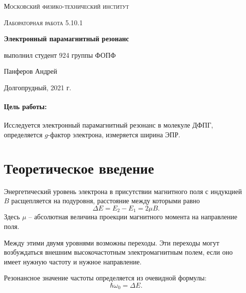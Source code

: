 \documentclass[a4paper, 12pt]{article}
\begin{document}
	
\begin{titlepage}
	\centering
	\vspace{5cm}
	{\scshape\LARGE Московский физико-технический институт \par}
	\vspace{4cm}
	{\scshape\Large Лабораторная работа 5.10.1 \par}
	\vspace{1cm}
	{\huge\bfseries Электронный парамагнитный резонанс \par}
	\vspace{1cm}
	\vfill
\begin{flushright}
	{\large выполнил студент 924 группы ФОПФ}\par
	\vspace{0.3cm}
	{\LARGE Панферов Андрей}
\end{flushright}
	

	\vfill

	Долгопрудный, 2021 г.
\end{titlepage}

\paragraph*{Цель работы:} Исследуется электронный парамагнитный резонанс в молекуле ДФПГ, определяется $g$-фактор электрона, измеряется ширина ЭПР.                                                                              

\section*{Теоретическое введение}
	Энергетический уровень электрона в присутствии магнитного поля с индукцией $B$ расщепляется на подуровня, расстояние между которыми равно 
	\begin{equation}
		\label{eq:dE}
		\Delta E = E_2 - E_1 = 2\mu B.
	\end{equation}
	Здесь $\mu$ -- абсолютная величина проекции магнитного момента на направление поля.
	
	Между этими двумя уровнями возможны переходы. Эти переходы могут возбуждаться внешним высокочастотным электромагнитным полем, если оно имеет нужную частоту и нужное направление.
	
	Резонансное значение частоты определяется из очевидной формулы:
	\begin{equation}
		\label{eq:resonans_omega}
		\hbar \omega_0 = \Delta E.
	\end{equation}
\end{document}
